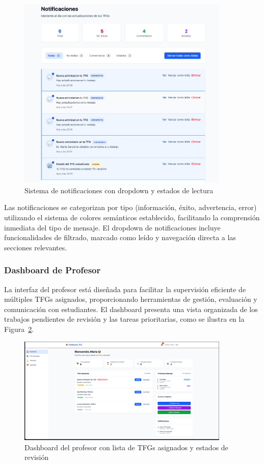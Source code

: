 \documentclass[12pt,a4paper,oneside]{report}
\begin{document}
\begin{figure}[H]
\centering
\includegraphics[width=0.9\textwidth]{processed/images/sistema_notificaciones.png}
\caption{Sistema de notificaciones con dropdown y estados de lectura}
\label{fig:sistema-notificaciones}
\end{figure}

Las notificaciones se categorizan por tipo (información, éxito, advertencia, error) utilizando el sistema de colores semánticos establecido, facilitando la comprensión inmediata del tipo de mensaje. El dropdown de notificaciones incluye funcionalidades de filtrado, marcado como leído y navegación directa a las secciones relevantes.

\subsubsection{Dashboard de Profesor}\label{dashboard-de-profesor}

La interfaz del profesor está diseñada para facilitar la supervisión eficiente de múltiples TFGs asignados, proporcionando herramientas de gestión, evaluación y comunicación con estudiantes. El dashboard presenta una vista organizada de los trabajos pendientes de revisión y las tareas prioritarias, como se ilustra en la Figura~\ref{fig:dashboard-profesor}.

\begin{figure}[H]
\centering
\includegraphics[width=0.9\textwidth]{processed/images/dashboard_profesor.png}
\caption{Dashboard del profesor con lista de TFGs asignados y estados de revisión}
\label{fig:dashboard-profesor}
\end{figure}
\end{document}
